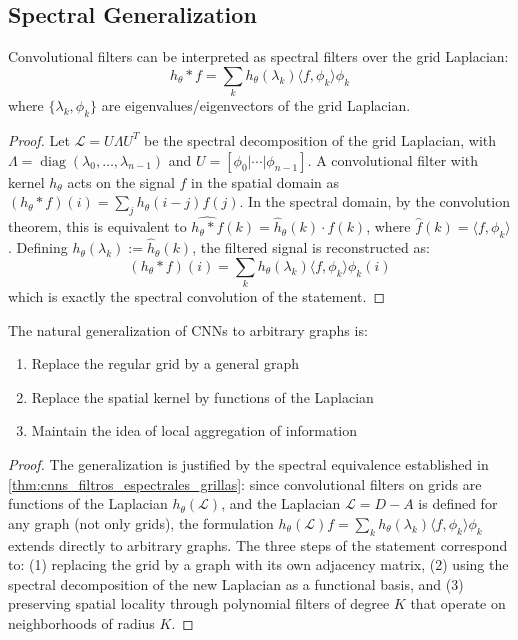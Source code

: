 \subsection{Spectral Generalization}\label{subsec:generalizacion_espectral}

\begin{theorem}\label{thm:cnns_filtros_espectrales_grillas}
Convolutional filters can be interpreted as spectral
filters over the grid Laplacian:
\[
h_\theta * f = \sum_k h_\theta(\lambda_k)\langle f, \phi_k\rangle\phi_k
\]
where \(\{\lambda_k, \phi_k\}\) are eigenvalues/eigenvectors of the grid Laplacian.
\end{theorem}

\begin{proof}
Let $\mathcal{L} = U \Lambda U^T$ be the spectral decomposition of the grid Laplacian, with $\Lambda = \operatorname{diag}(\lambda_0, \ldots, \lambda_{n-1})$ and $U = [\phi_0 | \cdots | \phi_{n-1}]$. A convolutional filter with kernel $h_\theta$ acts on the signal $f$ in the spatial domain as $(h_\theta * f)(i) = \sum_j h_\theta(i-j) f(j)$. In the spectral domain, by the convolution theorem, this is equivalent to $\widehat{h_\theta * f}(k) = \hat{h}_\theta(k) \cdot \hat{f}(k)$, where $\hat{f}(k) = \langle f, \phi_k \rangle$. Defining $h_\theta(\lambda_k) := \hat{h}_\theta(k)$, the filtered signal is reconstructed as:
\[
(h_\theta * f)(i) = \sum_k h_\theta(\lambda_k) \langle f, \phi_k \rangle \phi_k(i)
\]
which is exactly the spectral convolution of the statement.
\end{proof}

\begin{proposition}\label{prop:grillas_a_grafos}
The natural generalization of CNNs to arbitrary graphs is:
\begin{enumerate}
	\item Replace the regular grid by a general graph
	\item Replace the spatial kernel by functions of the Laplacian
	\item Maintain the idea of local aggregation of information
\end{enumerate}
\end{proposition}

\begin{proof}
The generalization is justified by the spectral equivalence established in \autoref{thm:cnns_filtros_espectrales_grillas}: since convolutional filters on grids are functions of the Laplacian $h_\theta(\mathcal{L})$, and the Laplacian $\mathcal{L} = D - A$ is defined for any graph (not only grids), the formulation $h_\theta(\mathcal{L})f = \sum_k h_\theta(\lambda_k)\langle f, \phi_k \rangle \phi_k$ extends directly to arbitrary graphs. The three steps of the statement correspond to: (1) replacing the grid by a graph with its own adjacency matrix, (2) using the spectral decomposition of the new Laplacian as a functional basis, and (3) preserving spatial locality through polynomial filters of degree $K$ that operate on neighborhoods of radius $K$.
\end{proof}


